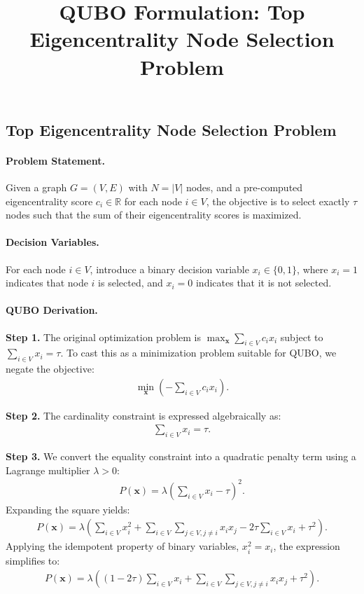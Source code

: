 \documentclass[12pt]{article}
\title{QUBO Formulation: Top Eigencentrality Node Selection Problem}
\date{}
\begin{document}
\maketitle

\subsection*{Top Eigencentrality Node Selection Problem}

\paragraph{Problem Statement.}
Given a graph $G = (V, E)$ with $N = |V|$ nodes, and a pre-computed eigencentrality score $c_i \in \mathbb{R}$ for each node $i \in V$, the objective is to select exactly $\tau$ nodes such that the sum of their eigencentrality scores is maximized.

\paragraph{Decision Variables.}
For each node $i \in V$, introduce a binary decision variable $x_i \in \{0, 1\}$, where $x_i = 1$ indicates that node $i$ is selected, and $x_i = 0$ indicates that it is not selected.

\paragraph{QUBO Derivation.}
\textbf{Step 1.} The original optimization problem is $\max_{\mathbf{x}} \sum_{i \in V} c_i x_i$ subject to $\sum_{i \in V} x_i = \tau$. To cast this as a minimization problem suitable for QUBO, we negate the objective:
\begin{align}
\min_{\mathbf{x}} \left( -\sum_{i \in V} c_i x_i \right).
\end{align}

\textbf{Step 2.} The cardinality constraint is expressed algebraically as:
\begin{align}
\sum_{i \in V} x_i = \tau.
\end{align}

\textbf{Step 3.} We convert the equality constraint into a quadratic penalty term using a Lagrange multiplier $\lambda > 0$:
\begin{align}
P(\mathbf{x}) = \lambda \left( \sum_{i \in V} x_i - \tau \right)^2.
\end{align}
Expanding the square yields:
\begin{align}
P(\mathbf{x}) = \lambda \left( \sum_{i \in V} x_i^2 + \sum_{i \in V} \sum_{j \in V, j \neq i} x_i x_j - 2\tau \sum_{i \in V} x_i + \tau^2 \right).
\end{align}
Applying the idempotent property of binary variables, $x_i^2 = x_i$, the expression simplifies to:
\begin{align}
P(\mathbf{x}) = \lambda \left( (1 - 2\tau) \sum_{i \in V} x_i + \sum_{i \in V} \sum_{j \in V, j \neq i} x_i x_j + \tau^2 \right).
\end{align}
\end{document}
